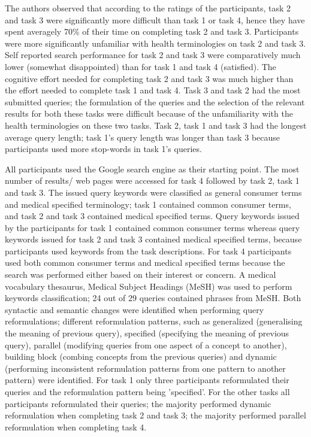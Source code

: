 \documentclass[]{article}
\begin{document}
The authors observed that according to the ratings of the participants, task 2 and task 3 were significantly more difficult than task 1 or task 4, hence they have spent averagely 70\% of their time on completing task 2 and task 3. 
Participants were more significantly unfamiliar with health terminologies on task 2 and task 3. 
Self reported search performance for task 2 and task 3 were comparatively much lower (somewhat disappointed) than for task 1 and task 4 (satisfied). The cognitive effort needed for completing task 2 and task 3 was much higher than the effort needed to complete task 1 and task 4. 
Task 3 and task 2 had the most submitted queries; the formulation of the queries and the selection of the relevant results for both these tasks were difficult because of the unfamiliarity with the health terminologies on these two tasks. 
Task 2, task 1 and task 3 had the longest average query length; task 1's query length was longer than task 3 because participants used more stop-words in task 1's queries. 

All participants used the Google search engine as their starting point. The most number of results/ web pages were accessed for task 4 followed by task 2, task 1 and task 3. The issued query keywords were classified as general consumer terms and medical specified terminology; task 1 contained common consumer terms, and task 2 and task 3 contained medical specified terms. Query keywords issued  by the participants for task 1 contained common consumer terms whereas query keywords issued for task 2 and task 3 contained medical specified terms, because participants used keywords from the task descriptions. For task 4 participants used both common consumer terms and medical specified terms because the search was performed either based on their interest or concern. 
A medical vocabulary thesaurus, Medical Subject Headings (MeSH) was used to perform keywords classification; 24 out of 29 queries contained phrases from MeSH. 
Both syntactic and semantic changes were identified when performing query reformulations; different reformulation patterns, such as generalized (generalising the meaning of previous query), specified (specifying the meaning of previous query), parallel (modifying queries from one aspect of a concept to another), building block (combing concepts from the previous queries) and dynamic (performing inconsistent reformulation patterns from one pattern to another pattern) were identified. For task 1 only three participants reformulated their queries and the reformulation pattern being 'specified'. For the other tasks all participants reformulated their queries; the majority performed dynamic reformulation when completing task 2 and task 3; the majority performed parallel reformulation when completing task 4. 
\end{document}
